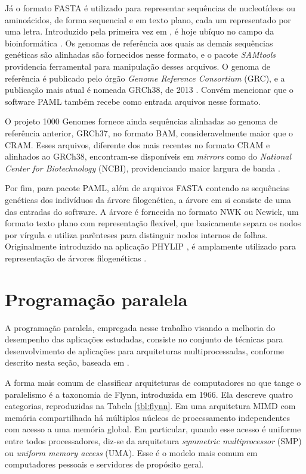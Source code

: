 \documentclass[cic,tc]{iiufrgs}
\begin{document}
Já o formato FASTA é utilizado para representar sequências de nucleotídeos ou
aminoácidos, de forma sequencial e em texto plano, cada um representado por uma
letra. Introduzido pela primeira vez em \cite{fasta}, é hoje ubíquo no campo da
bioinformática \cite{shen2016seqkit}.  Os genomas de referência aos quais as
demais sequências genéticas são alinhadas são fornecidos nesse formato, e o
pacote \textit{SAMtools} providencia ferramental para manipulação desses
arquivos. O genoma de referência é publicado pelo órgão \textit{Genome
Reference Consortium} (GRC), e a publicação mais atual é nomeada GRCh38, de
2013 \cite{GUO201783}. Convém mencionar que o software PAML também recebe como
entrada arquivos nesse formato.

O projeto 1000 Genomes fornece ainda sequências alinhadas ao genoma de
referência anterior, GRCh37, no formato BAM, consideravelmente maior que o
CRAM. Esses arquivos, diferente dos mais recentes no formato CRAM e alinhados
ao GRCh38, encontram-se disponíveis em \textit{mirrors} como do
\textit{National Center for Biotechnology} (NCBI), providenciando maior largura
de banda \cite{clarke20121000}.

Por fim, para pacote PAML, além de arquivos FASTA contendo as sequências
genéticas dos indivíduos da árvore filogenética, a árvore em si consiste de uma
das entradas do software. A árvore é fornecida no formato NWK ou Newick, um
formato texto plano com representação flexível, que basicamente separa os nodos
por vírgula e utiliza parênteses para distinguir nodos internos de folhas.
Originalmente introduzido na aplicação PHYLIP \cite{felsenstein1993phylip}, é
amplamente utilizado para representação de árvores filogenéticas \cite{fredslund2006phy}.

\section{Programação paralela}
\label{sec:par}

A programação paralela, empregada nesse trabalho visando a melhoria do
desempenho das aplicações estudadas, consiste no conjunto de técnicas para
desenvolvimento de aplicações para arquiteturas multiprocessadas, conforme
descrito nesta seção, baseada em \cite{el2005advanced}.

A forma mais comum de classificar arquiteturas de computadores no que tange o
paralelismo é a taxonomia de Flynn, introduzida em 1966. Ela descreve quatro
categorias, reproduzidas na Tabela \ref{tbl:flynn}. Em uma arquitetura MIMD com
memória compartilhada há múltiplos núcleos de processamento independentes com
acesso a uma memória global. Em particular, quando esse acesso é uniforme entre
todos processadores, diz-se da arquitetura \textit{symmetric multiprocessor}
(SMP) ou \textit{uniform memory access} (UMA). Esse é o modelo mais comum em
computadores pessoais e servidores de propósito geral.
\end{document}
